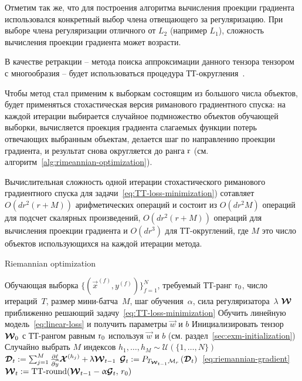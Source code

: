 Отметим так же, что для построения алгоритма вычисления проекции градиента использовался конкретный выбор члена отвещающего за регуляризацию. При выборе члена регуляризации отличного от  $L_2$ (например $L_1$), сложность вычисления проекции градиента может возрасти.

В качестве ретракции -- метода поиска аппроксимации данного тензора тензором с многообразия -- будет использоваться процедура ТТ-округления~\cite{oseledets2011ttMain}.

Чтобы метод стал применим к выборкам состоящим из большого числа объектов, будет применяться стохастическая версия риманового градиентного спуска: на каждой итерации выбирается случайное подмножество объектов обучающей выборки, вычисляется проекция градиента слагаемых функции потерь отвечающих выбранным объектам, делается шаг по направлению проекции градиента, и результат снова округляется до ранга $\operatorname{r}$ (см. алгоритм~\ref{alg:rimeannian-optimization}).

Вычислительная сложность одной итерации стохастического риманового градиентного спуска для задачи~\eqref{eq:TT-loss-minimization}) сотавляет $O(dr^2(r + M))$ арифметических операций и состоит из $O(dr^2M)$ операций для подсчет скалярных произведений,  $O(dr^2(r + M))$ операций для вычисления проекции градиента и $O(dr^3)$ для ТТ-округлений, где $M$ это число объектов использующихся на каждой итерации метода.

\begin{algorithm}[t]
   \caption{Riemannian optimization}
   \label{alg:rimeannian-optimization}
\begin{algorithmic}
    Обучающая выборка $\{(\vec{x}^{(f)}, y^{(f)})\}_{f=1}^N$, требуемый ТТ-ранг $\operatorname{r}_0$, число итераций~$T$, размер мини-батча~$M$, шаг обучения~$\alpha$, сила регуляризатора~$\lambda$
    $\boldsymbol{\mathcal{W}}$ приближенно решающий задачу~\eqref{eq:TT-loss-minimization}
   \STATE Обучить линейную модель~\eqref{eq:linear-loss} и получить параметры $\vec{w}$ и $b$
   \STATE Инициализировать тензор $\boldsymbol{\mathcal{W}}_0$ с ТТ-рангом равным $\operatorname{r}_0$ используя $\vec{w}$ и $b$  (см. раздел~\ref{sec:exm-initialization})
        \STATE Случайно выбрать $M$ индексов $h_1, \ldots, h_M \sim \mathcal{U}(\{1, \ldots, N\})$
        \STATE $\boldsymbol{\mathcal{D}}_t := \sum_{j=1}^M \frac{\partial \ell}{\partial \widehat{y}} \boldsymbol{\mathcal{X}}^{(h_j)}  + \uplambda \boldsymbol{\mathcal{W}}_{t-1}$
        \STATE $\boldsymbol{\mathcal{G}}_t := P_{T_{\boldsymbol{\mathcal{W}}_{t-1}} \mathcal{M}_r}\left ( \boldsymbol{\mathcal{D}}_t \right)$~\eqref{eq:riemannian-gradient}
        \STATE $\boldsymbol{\mathcal{W}}_{t} := \operatorname{TT-round}(\boldsymbol{\mathcal{W}}_{t-1} - \upalpha \boldsymbol{\mathcal{G}}_t, \,r_0)$
   \ENDFOR
\end{algorithmic}
\end{algorithm}


